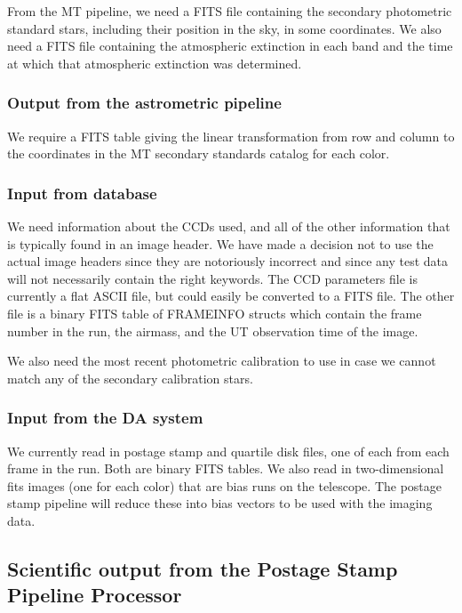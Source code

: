 From the MT pipeline, we need a FITS file containing the secondary
photometric standard stars, including their position in the sky, in some
coordinates.  We also need a FITS file containing the atmospheric
extinction in each band and the time at which that atmospheric extinction
was determined.

\subsubsection{Output from the astrometric pipeline}

We require a FITS table giving the linear transformation from row and column to
the coordinates in the MT secondary standards catalog for each color.

\subsubsection{Input from database}

We need information about the CCDs used, and all of the other information
that is typically found in an image header.  We have made a decision not
to use the actual image headers since they are notoriously incorrect and
since any test data will not necessarily contain the right keywords.
The CCD parameters file is currently a flat ASCII file, but could easily
be converted to a FITS file.  The other file is a binary FITS table of
FRAMEINFO structs which contain the frame number in the run, the airmass,
and the UT observation time of the image.

We also need the most recent photometric calibration to use in case we
cannot match any of the secondary calibration stars.

\subsubsection{Input from the DA system} 

We currently read in postage stamp and quartile disk files, one of each
from each frame in the run.  Both are binary FITS tables.  We also read
in two-dimensional fits images (one for each color) that are bias runs
on the telescope.  The postage stamp pipeline will reduce these into
bias vectors to be used with the imaging data.

\subsection{Scientific output from the Postage Stamp Pipeline Processor}

